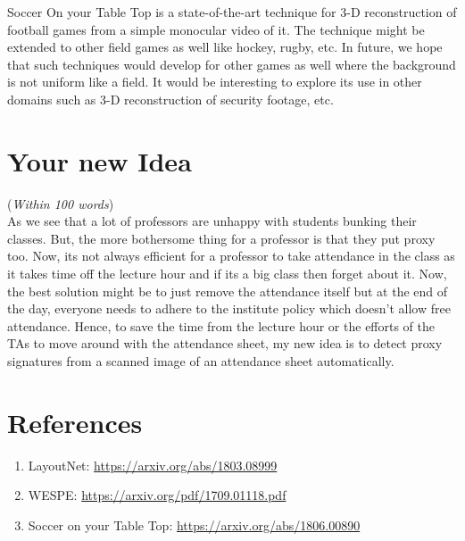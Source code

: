 \documentclass[11pt]{article}
\begin{document}
Soccer On your Table Top is a state-of-the-art technique for 3-D reconstruction of football games from a simple monocular video of it. The technique might be extended to other field games as well like hockey, rugby, etc. In future, we hope that such techniques would develop for other games as well where the background is not uniform like a field. It would be interesting to explore its use in other domains such as 3-D reconstruction of security footage, etc.

\section{Your new Idea}
({\em Within 100 words})\\

As we see that a lot of professors are unhappy with students bunking their classes. But, the more bothersome thing for a professor is that they put proxy too. Now, its not always efficient for a professor to take attendance in the class as it takes time off the lecture hour and if its a big class then forget about it. Now, the best solution might be to just remove the attendance itself but at the end of the day, everyone needs to adhere to the institute policy which doesn't allow free attendance. Hence, to save the time from the lecture hour or the efforts of the TAs to move around with the attendance sheet, my new idea is to detect proxy signatures from a scanned image of an attendance sheet automatically. 

\section{References}
\begin{enumerate}
    \item {LayoutNet}: \url{https://arxiv.org/abs/1803.08999}
    \item {WESPE}: \url{https://arxiv.org/pdf/1709.01118.pdf}
    \item {Soccer on your Table Top}: \url{https://arxiv.org/abs/1806.00890}
\end{enumerate}
\end{document}
